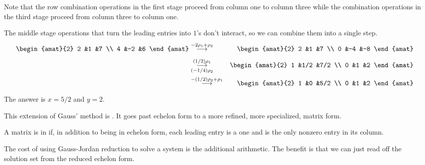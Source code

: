 Note that the row combination operations in the first stage proceed from column
one to column three while the combination operations in the third stage proceed 
from column three to column one.

\begin{example}
The middle stage operations that 
turn the leading entries into \( 1 \)'s
don't interact, so we can combine them into a single step.
\begin{eqnarray*}
    \begin{amat}{2}
       2   &1   &7   \\
       4   &-2  &6
    \end{amat}
  &\grstep{-2\rho_1+\rho_2}
  &\begin{amat}{2}
       2   &1   &7   \\
       0   &-4  &-8
    \end{amat}                                   \\
  &\grstep[(-1/4)\rho_2]{(1/2)\rho_1}
  &\begin{amat}{2}
       1   &1/2   &7/2   \\
       0   &1     &2
    \end{amat}                                    \\
  &\grstep{-(1/2)\rho_2+\rho_1}
  &\begin{amat}{2}
       1   &0   &5/2   \\
       0   &1   &2
    \end{amat}
\end{eqnarray*}
The answer is $x=5/2$ and $y=2$.
\end{example}

This extension of Gauss' method is 
.
It goes past echelon form to a more refined, more specialized,
matrix form.

\begin{definition}\label{def:RedEchForm}
A matrix is in
if, in addition to being in echelon form, each leading entry is a
one and is the only nonzero entry in its column.
\end{definition}

\noindent
The cost of using Gauss-Jordan reduction to solve a system 
is the additional arithmetic.
The benefit is that we can just read off the solution set
from the reduced echelon form.

